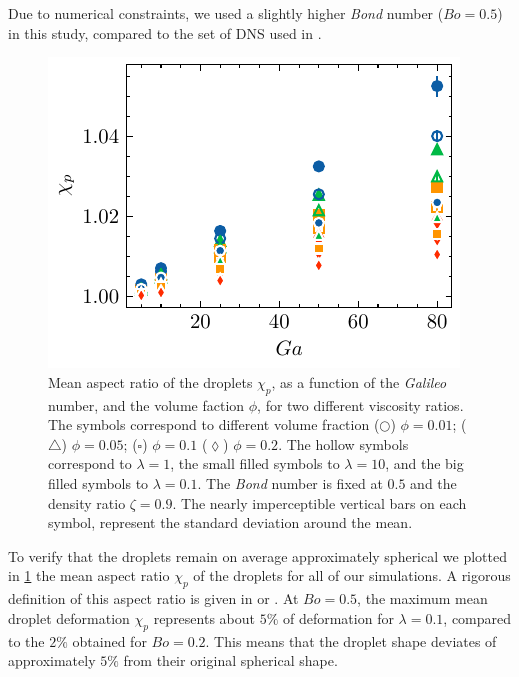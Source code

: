 Due to numerical constraints, we used a slightly higher \textit{Bond} number ($Bo = 0.5$) in this study, compared to the set of DNS used in \citet{fintzi2024buoyancy}. 
\begin{figure}[h!]
    \centering
    \includegraphics[height = 0.3\textwidth]{image/HOMOGENEOUS_final/PA/chi.pdf}
    \caption{Mean aspect ratio of the droplets $\chi_p$, as a function of the \textit{Galileo} number, and the volume faction $\phi$,  for two different viscosity ratios.  
    The symbols correspond to different volume fraction ($\pmb\bigcirc$) $\phi = 0.01$; ($\pmb\triangle$) $ \phi = 0.05$; ($\pmb\square$) $\phi = 0.1$ ($\pmb\lozenge$) $\phi = 0.2$.
    The hollow symbols correspond to $\lambda = 1$, the small filled symbols to $\lambda = 10$, and the big filled symbols to $\lambda = 0.1$.
    The \textit{Bond} number is fixed at $0.5$ and the density ratio $\zeta = 0.9$. 
    The nearly imperceptible vertical bars on each symbol, represent the standard deviation around the mean.  
    }
    \label{fig:chi2}
\end{figure}
To verify that the droplets remain on average approximately spherical we plotted in \ref{fig:chi2} the mean aspect ratio $\chi_p$ of the droplets for all of our simulations. 
A rigorous definition of this aspect ratio is given in \citet[Appendix 1]{fintzi2024buoyancy} or \citet{bunner2003effect}. 
At $Bo = 0.5$, the maximum mean droplet deformation $\chi_p$ represents about $5\%$ of deformation for $\lambda = 0.1$, compared to the $2\%$ obtained for $Bo = 0.2$. 
This means that the droplet shape deviates of approximately $5\%$ from their original spherical shape. 


